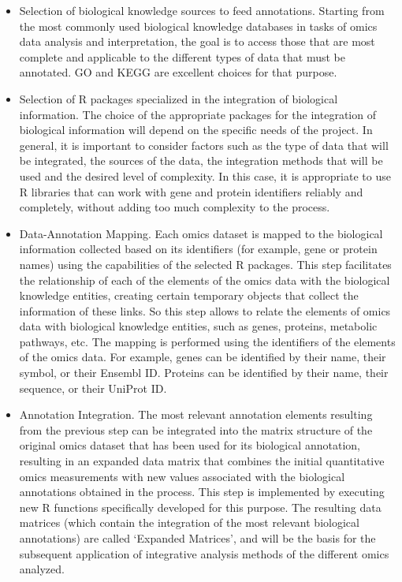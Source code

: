 \documentclass[a4paper, nobind]{templates/ociamthesis}
\begin{document}
\begin{itemize}
\item
  Selection of biological knowledge sources to feed annotations. Starting from the most commonly used biological knowledge databases in tasks of omics data analysis and interpretation, the goal is to access those that are most complete and applicable to the different types of data that must be annotated. GO and KEGG are excellent choices for that purpose.
\item
  Selection of R packages specialized in the integration of biological information. The choice of the appropriate packages for the integration of biological information will depend on the specific needs of the project. In general, it is important to consider factors such as the type of data that will be integrated, the sources of the data, the integration methods that will be used and the desired level of complexity. In this case, it is appropriate to use R libraries that can work with gene and protein identifiers reliably and completely, without adding too much complexity to the process.
\item
  Data-Annotation Mapping. Each omics dataset is mapped to the biological information collected based on its identifiers (for example, gene or protein names) using the capabilities of the selected R packages. This step facilitates the relationship of each of the elements of the omics data with the biological knowledge entities, creating certain temporary objects that collect the information of these links. So this step allows to relate the elements of omics data with biological knowledge entities, such as genes, proteins, metabolic pathways, etc. The mapping is performed using the identifiers of the elements of the omics data. For example, genes can be identified by their name, their symbol, or their Ensembl ID. Proteins can be identified by their name, their sequence, or their UniProt ID.
\item
  Annotation Integration. The most relevant annotation elements resulting from the previous step can be integrated into the matrix structure of the original omics dataset that has been used for its biological annotation, resulting in an expanded data matrix that combines the initial quantitative omics measurements with new values associated with the biological annotations obtained in the process. This step is implemented by executing new R functions specifically developed for this purpose. The resulting data matrices (which contain the integration of the most relevant biological annotations) are called `Expanded Matrices', and will be the basis for the subsequent application of integrative analysis methods of the different omics analyzed.
\end{itemize}
\end{document}
